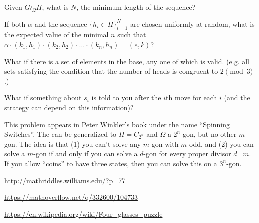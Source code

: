 \documentclass{article}
\begin{document}
\begin{related}
  \item Given $G \wr_\Omega H$, what is $N$, the minimum length of the sequence?
  \item If both $\alpha$ and the sequence $\{h_i \in H\}_{i=1}^N$ are chosen
  uniformly at random, what is the expected value of the minimal $n$ such that $
    \alpha \cdot (k_1, h_1) \cdot (k_2, h_2) \cdot \dots \cdot (k_n, h_n) = (e, k)
  $?
  \item What if there is a set of elements in the base, any one of which is valid.
  (e.g. all sets satisfying the condition that the number of heads is congruent
  to $2 \pmod 3$.)
  \item What if something about $s_i$ is told to you after the $i$th move for each
    $i$ (and the strategy can depend on this information)?
\end{related}
\begin{note}
  This problem appears in
  \href{https://www.goodreads.com/book/show/668035.Mathematical_Puzzles}{Peter Winkler's book}
  under the name ``Spinning Switches''.
  The can be generalized to $H = C_{2^n}$ and $\Omega$ a $2^n$-gon,
  but no other $m$-gon.
  The idea is that (1) you can't solve any $m$-gon with $m$ odd, and (2) you
  can solve a $m$-gon if and only if you can solve a $d$-gon for every proper
  divisor $d \mid m$.
  If you allow ``coins'' to have three states, then you can solve this on a
  $3^n$-gon.
\end{note}

\begin{references}
  \item \url{http://mathriddles.williams.edu/?p=77}
  \item \url{https://mathoverflow.net/q/332600/104733}
  \item \url{https://en.wikipedia.org/wiki/Four_glasses_puzzle}
\end{references}
\end{document}
